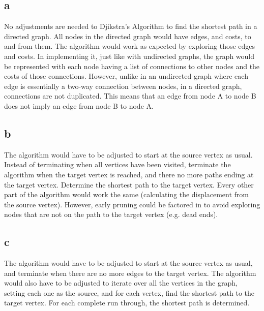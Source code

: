 \documentclass{article}
\begin{document}
\subsection*{a}
No adjustments are needed to Djikstra's Algorithm to find the shortest path in a directed graph.
All nodes in the directed graph would have edges, and costs, to and from them. The algorithm would
work as expected by exploring those edges and costs. In implementing it, just like with undirected
graphs, the graph would be represented with each node having a list of connections to other nodes
and the costs of those connections. However, unlike in an undirected graph where each edge is essentially
a two-way connection between nodes, in a directed graph, connections are not duplicated. This means that
an edge from node A to node B does not imply an edge from node B to node A.

\subsection*{b}
The algorithm would have to be adjusted to start at the source vertex as usual.
Instead of terminating when all vertices have been visited, terminate the algorithm
when the target vertex is reached, and there no more paths ending at the target vertex.
Determine the shortest path to the target vertex. Every
other part of the algorithm would work the same (calculating the displacement from the source vertex).
However, early pruning could be factored in to avoid exploring nodes that are not on the path to the target vertex (e.g. dead ends).
\\
\subsection*{c}
The algorithm would have to be adjusted to start at the source vertex as usual,
and terminate when there are no more edges to the target vertex. The algorithm would also have to be
adjusted to iterate over all the vertices in the graph, setting each one as the source,
and for each vertex,
find the shortest path to the target vertex. For each complete run through,
the shortest path is determined.
\end{document}
